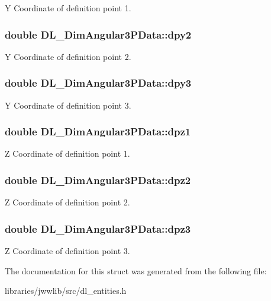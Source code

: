 Y Coordinate of definition point 1. \hypertarget{structDL__DimAngular3PData_aa1b75635b26400b43fb13ca39ca317e9}{
\subsubsection[{dpy2}]{\setlength{\rightskip}{0pt plus 5cm}double D\-L\-\_\-\-Dim\-Angular3\-P\-Data\-::dpy2}}\label{structDL__DimAngular3PData_aa1b75635b26400b43fb13ca39ca317e9}
Y Coordinate of definition point 2. \hypertarget{structDL__DimAngular3PData_a4d2131d3149e6024da869ff141479255}{
\subsubsection[{dpy3}]{\setlength{\rightskip}{0pt plus 5cm}double D\-L\-\_\-\-Dim\-Angular3\-P\-Data\-::dpy3}}\label{structDL__DimAngular3PData_a4d2131d3149e6024da869ff141479255}
Y Coordinate of definition point 3. \hypertarget{structDL__DimAngular3PData_a0f026aac573573827e38f0a09c63c1e6}{
\subsubsection[{dpz1}]{\setlength{\rightskip}{0pt plus 5cm}double D\-L\-\_\-\-Dim\-Angular3\-P\-Data\-::dpz1}}\label{structDL__DimAngular3PData_a0f026aac573573827e38f0a09c63c1e6}
Z Coordinate of definition point 1. \hypertarget{structDL__DimAngular3PData_a738a84bbf441846b6637fe614cf8ea55}{
\subsubsection[{dpz2}]{\setlength{\rightskip}{0pt plus 5cm}double D\-L\-\_\-\-Dim\-Angular3\-P\-Data\-::dpz2}}\label{structDL__DimAngular3PData_a738a84bbf441846b6637fe614cf8ea55}
Z Coordinate of definition point 2. \hypertarget{structDL__DimAngular3PData_a934dc7d6446107520dc805571f94b4be}{
\subsubsection[{dpz3}]{\setlength{\rightskip}{0pt plus 5cm}double D\-L\-\_\-\-Dim\-Angular3\-P\-Data\-::dpz3}}\label{structDL__DimAngular3PData_a934dc7d6446107520dc805571f94b4be}
Z Coordinate of definition point 3. 

The documentation for this struct was generated from the following file\-:\begin{DoxyCompactItemize}
\item 
libraries/jwwlib/src/dl\-\_\-entities.\-h\end{DoxyCompactItemize}
